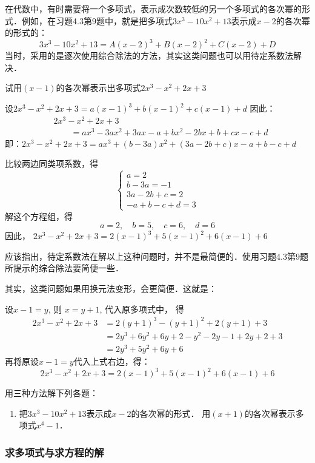 在代数中，有时需要将一个多项式，表示成次数较低的另一个多项式的各次幂的形式．例如，在习题4.3第9题中，就是把多项式$3x^3-10x^2+13$表示成$x-2$的各次幂的形式的：
\[3x^3-10x^2+13=A (x-2)^3 +B (x-2)^2+ C (x-2) +D\]
当时，采用的是逐次使用综合除法的方法，其实这类问题也可以用待定系数法解决．


\begin{example}
试用$(x-1)$的各次幂表示出多项式$2x^3-x^2+2x+3$
\end{example}


\begin{solution}
设$2x^3-x^2+2x+3=a(x-1)^3+b(x-1)^2+c(x-1)+d$
因此：
\[\begin{split}
    &2x^3-x^2+2x+3\\
&\qquad =ax^3-3ax^2+3ax-a+bx^2-2bx+b+cx-c+d
\end{split}\]
即：$2x^3-x^2+2x+3 =ax^3+(b-3a)x^2+(3a-2b+c)x-a+b-c+d$

比较两边同类项系数，得
\[\begin{cases}
    a=2\\
    b-3a=-1\\
    3a-2b+c=2\\
    -a+b-c+d=3
\end{cases}\]
解这个方程组，得
\[a=2,\quad b=5,\quad c=6,\quad d=6\]
因此，
$2x^3-x^2+2x+3 =2(x-1)^3+5(x-1)^2+6(x-1)+6$
\end{solution}

应该指出，待定系数法在解以上这种问题时，并不是最简便的．使用习题4.3第9题所提示的综合除法要简便一些．

其实，这类问题如果用换元法变形，会更简便．这就是：

设$x-1=y$, 则
$x=y+1$, 代入原多项式中，
得
\[\begin{split}
    2x^3-x^2+2x+3&=2(y+1)^3-(y+1)^2+2(y+1)+3\\
&=2y^3+6y^2+6y+2-y^2-2y-1+2y+2+3\\
&=2y^3+5y^2+6y+6
\end{split}\]
再将原设$x-1=y$代入上式右边，得：
$$2x^3-x^2+2x+3=2(x-1)^3+5(x-1)^2+6(x-1)+6$$

\begin{ex}
    用三种方法解下列各题：
\begin{enumerate}
    \item 把$3x^3-10x^2+13$表示成$x-2$的各次幂的形式．
    \staritem 用$(x+1)$的各次幂表示多项式$x^4-1$． 
\end{enumerate}
\end{ex}

\subsubsection{求多项式与求方程的解}

